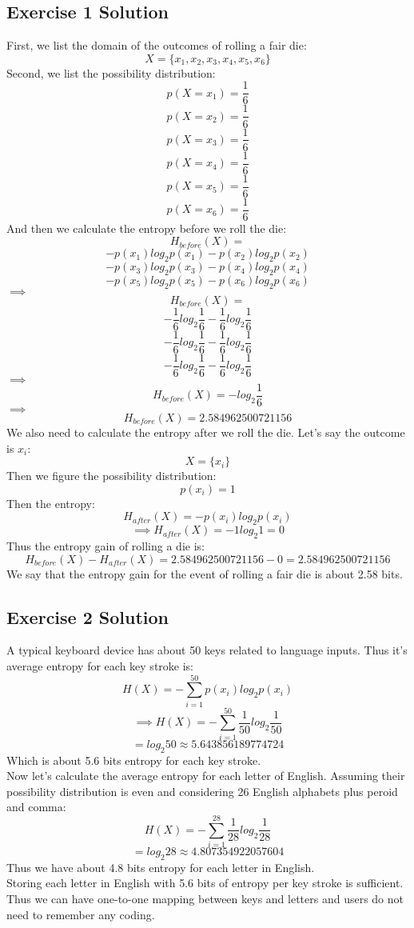 \documentclass[12pt]{article}
\begin{document}
\subsection{Exercise 1 Solution}
First, we list the domain of the outcomes of rolling a fair die:
\[
	X = \{x_1, x_2, x_3, x_4, x_5, x_6\}
\]
Second, we list the possibility distribution:
\[
	p(X=x_1) = \frac{1}{6}
\]
\[
	p(X=x_2) = \frac{1}{6}
\]
\[
	p(X=x_3) = \frac{1}{6}
\]
\[
	p(X=x_4) = \frac{1}{6}
\]
\[
	p(X=x_5) = \frac{1}{6}
\]
\[
	p(X=x_6) = \frac{1}{6}
\]
And then we calculate the entropy before we roll the die:
\[
	H_{before}(X) = 
\]
\[
	-p(x_1)log_{2}p(x_1)  
	- p(x_2)log_{2}p(x_2)
\]
\[
	- p(x_3)log_{2}p(x_3)
	- p(x_4)log_{2}p(x_4)
\]
\[
	- p(x_5)log_{2}p(x_5)
	- p(x_6)log_{2}p(x_6)
\]
$\implies$
\[
	H_{before}(X) = 
\]
\[
	-\frac{1}{6}log_{2}\frac{1}{6}  
	-\frac{1}{6}log_{2}\frac{1}{6}  
\]
\[
	-\frac{1}{6}log_{2}\frac{1}{6}  
	-\frac{1}{6}log_{2}\frac{1}{6}  
\]
\[
	-\frac{1}{6}log_{2}\frac{1}{6}  
	-\frac{1}{6}log_{2}\frac{1}{6}  
\]
$\implies$
\[
	H_{before}(X) = 
	-log_{2}\frac{1}{6}  
\]
$\implies$
\[
	H_{before}(X) = 2.584962500721156 
\]
We also need to calculate the entropy after we roll the die.
Let's say the outcome is $x_i$:
\[
	X = \{x_i\}
\]
Then we figure the possibility distribution:
\[
	p(x_i) = 1
\]
Then the entropy:
\[
	H_{after}(X) = 
	-p(x_i)log_{2}p(x_i)  
\]
\[
\implies
	H_{after}(X) = 
	-1log_{2}1 = 0
\]  
Thus the entropy gain of rolling a die is:
\[
	H_{before}(X) - H_{after}(X) = 2.584962500721156 - 0 = 2.584962500721156
\]
We say that the entropy gain for the event of rolling a fair die is about 2.58 bits.

\subsection{Exercise 2 Solution}
A typical keyboard device has about 50 keys related to language inputs. Thus it's average entropy for each key stroke is:
\[
	H(X) = -\sum_{i=1}^{50}p(x_i)log_{2}p(x_i)
\]
\[
\implies
	H(X) = -\sum_{i=1}^{50}\frac{1}{50}log_{2}\frac{1}{50}
\]
\[
	= log_{2}50 \approx 5.643856189774724
\]
Which is about 5.6 bits entropy for each key stroke.\\
Now let's calculate the average entropy for each letter of English. Assuming their possibility distribution is even and considering 26 English alphabets plus peroid and comma:
\[
	H(X) = -\sum_{i=1}^{28}\frac{1}{28}log_{2}\frac{1}{28}
\]
\[
	= log_{2}28 \approx 4.807354922057604
\]
Thus we have about 4.8 bits entropy for each letter in English.\\
Storing each letter in English with 5.6 bits of entropy per key stroke is sufficient. Thus we can have one-to-one mapping between keys and letters and users do not need to remember any coding.\\
\end{document}
